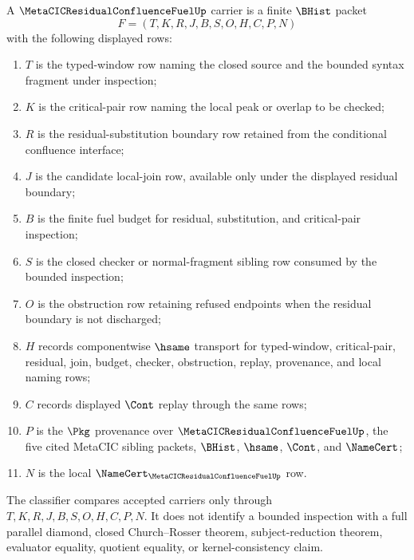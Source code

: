 \begin{definition}
\label{def:metacic-residual-confluence-fuel-carrier}
A $\MetaCICResidualConfluenceFuelUp$ carrier is a finite $\BHist$ packet
$$
F=(T,K,R,J,B,S,O,H,C,P,N)
$$
with the following displayed rows:
\begin{enumerate}
\item $T$ is the typed-window row naming the closed source and the bounded syntax fragment under inspection;
\item $K$ is the critical-pair row naming the local peak or overlap to be checked;
\item $R$ is the residual-substitution boundary row retained from the conditional confluence interface;
\item $J$ is the candidate local-join row, available only under the displayed residual boundary;
\item $B$ is the finite fuel budget for residual, substitution, and critical-pair inspection;
\item $S$ is the closed checker or normal-fragment sibling row consumed by the bounded inspection;
\item $O$ is the obstruction row retaining refused endpoints when the residual boundary is not discharged;
\item $H$ records componentwise $\hsame$ transport for typed-window, critical-pair, residual, join, budget, checker, obstruction, replay, provenance, and local naming rows;
\item $C$ records displayed $\Cont$ replay through the same rows;
\item $P$ is the $\Pkg$ provenance over $\MetaCICResidualConfluenceFuelUp$, the five cited MetaCIC sibling packets, $\BHist$, $\hsame$, $\Cont$, and $\NameCert$;
\item $N$ is the local $\NameCert_{\MetaCICResidualConfluenceFuelUp}$ row.
\end{enumerate}
The classifier compares accepted carriers only through $T,K,R,J,B,S,O,H,C,P,N$. It does not identify a bounded inspection with a full parallel diamond, closed Church--Rosser theorem, subject-reduction theorem, evaluator equality, quotient equality, or kernel-consistency claim.
\end{definition}

